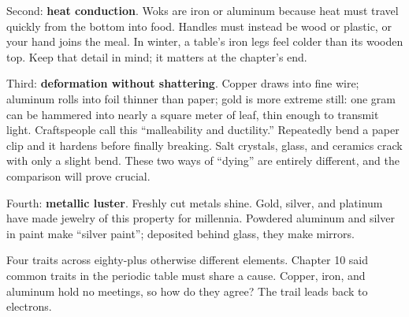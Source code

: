 Second: \textbf{heat conduction}. Woks are iron or aluminum because heat must travel quickly from the bottom into food. Handles must instead be wood or plastic, or your hand joins the meal. In winter, a table's iron legs feel colder than its wooden top. Keep that detail in mind; it matters at the chapter's end.

Third: \textbf{deformation without shattering}. Copper draws into fine wire; aluminum rolls into foil thinner than paper; gold is more extreme still: one gram can be hammered into nearly a square meter of leaf, thin enough to transmit light. Craftspeople call this ``malleability and ductility.'' Repeatedly bend a paper clip and it hardens before finally breaking. Salt crystals, glass, and ceramics crack with only a slight bend. These two ways of ``dying'' are entirely different, and the comparison will prove crucial.

Fourth: \textbf{metallic luster}. Freshly cut metals shine. Gold, silver, and platinum have made jewelry of this property for millennia. Powdered aluminum and silver in paint make ``silver paint''; deposited behind glass, they make mirrors.

Four traits across eighty-plus otherwise different elements. Chapter 10 said common traits in the periodic table must share a cause. Copper, iron, and aluminum hold no meetings, so how do they agree? The trail leads back to electrons.

